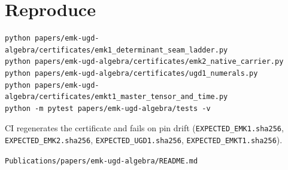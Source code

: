 \hypertarget{reproduce}{%
\section{Reproduce}\label{reproduce}}

\begin{verbatim}
python papers/emk-ugd-algebra/certificates/emk1_determinant_seam_ladder.py
python papers/emk-ugd-algebra/certificates/emk2_native_carrier.py
python papers/emk-ugd-algebra/certificates/ugd1_numerals.py
python papers/emk-ugd-algebra/certificates/emkt1_master_tensor_and_time.py
python -m pytest papers/emk-ugd-algebra/tests -v
\end{verbatim}

CI regenerates the certificate and fails on pin drift
(\texttt{EXPECTED\_EMK1.sha256}, \texttt{EXPECTED\_EMK2.sha256}, \texttt{EXPECTED\_UGD1.sha256}, \texttt{EXPECTED\_EMKT1.sha256}).

\begin{flushright}\small\texttt{Publications/papers/emk-ugd-algebra/README.md}\end{flushright}

